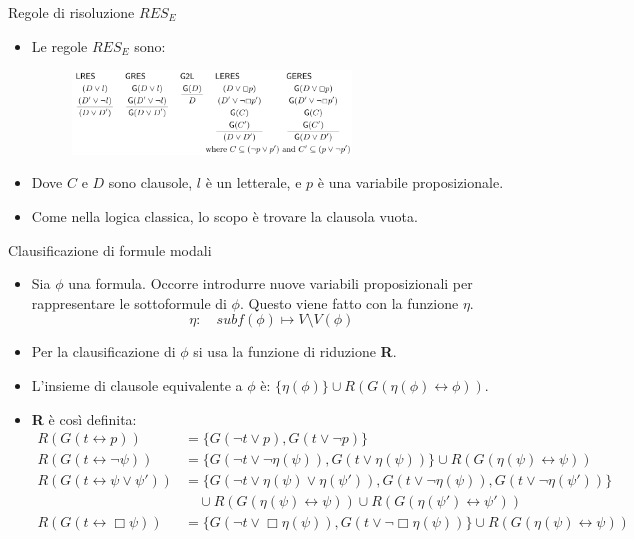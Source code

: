 \documentclass{beamer}
\newcommand{\tto} {\leftrightarrow}
\begin{document}
\begin{frame}{Regole di risoluzione $RES_E$}
    \begin{itemize}
        \item Le regole $RES_E$ sono:
        \begin{figure}
            \centering
            \includegraphics[width=0.7\textwidth, height=0.5\textheight]{assets/res_E.png}
        \end{figure} 
        \item Dove $C$ e $D$ sono clausole, $l$ è un letterale, e $p$ è una variabile proposizionale.
        \item Come nella logica classica, lo scopo è trovare la clausola vuota.
    \end{itemize}
\end{frame}

\begin{frame}{Clausificazione di formule modali}
    \begin{itemize}
        \item Sia $\phi$ una formula. Occorre introdurre nuove variabili proposizionali per rappresentare le sottoformule di $\phi$. Questo viene fatto con la funzione $\eta$.
        \[
            \eta: \quad subf(\phi) \mapsto V \setminus V(\phi)
        \]
        \item Per la clausificazione di $\phi$ si usa la funzione di riduzione \textbf{R}.
        \item L'insieme di clausole equivalente a $\phi$ è: $\{ \eta(\phi) \} \cup R(G(\eta(\phi) \tto \phi))$.
        \item \textbf{R} è così definita:
        \[
            \begin{aligned}
            R(G(t \tto p)) &= \{ G(\lnot t \lor p), G(t \lor \lnot p) \} \\
            R(G(t \tto \lnot \psi)) &= \{ G(\lnot t \lor \lnot \eta(\psi)), G(t \lor \eta(\psi)) \} \cup R(G(\eta(\psi) \tto \psi)) \\
            R(G(t \tto \psi \lor \psi')) &= \{ G(\lnot t \lor \eta(\psi) \lor \eta(\psi')), G(t \lor \lnot \eta(\psi)), G(t \lor \lnot \eta(\psi')) \} \\
            & \quad \cup R(G(\eta(\psi) \tto \psi)) \cup R(G(\eta(\psi') \tto \psi')) \\
            R(G(t \tto \Box \psi)) &= \{ G(\lnot t \lor \Box \eta(\psi)), G(t \lor \lnot \Box \eta(\psi)) \} \cup R(G(\eta(\psi) \tto \psi))
            \end{aligned}
        \]
    \end{itemize}
\end{frame}
\end{document}
